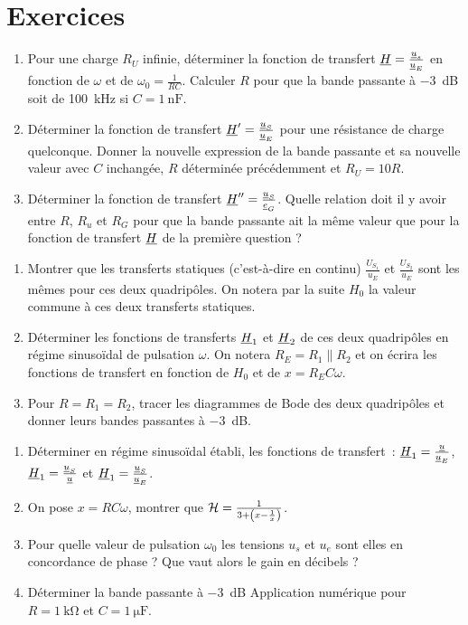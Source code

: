 \section{Exercices}
\begin{exercice}
	\begin{enumerate}
		\item Pour une charge $R_U$ infinie, déterminer la fonction de transfert $\underline{H} = \frac{\underline{u}_s}{\underline{u}_E}$ en fonction de $\omega$ et de $\omega_0 = \frac{1}{RC}$. Calculer $R$ pour que la bande passante à \SI{-3}{\dB} soit de \SI{100}{\kilo\hertz} si $C=\SI{1}{\nano\farad}$.
		\item Déterminer la fonction de transfert $\underline{H}' = \frac{\underline{u}_S}{\underline{u}_E}$ pour une résistance de charge quelconque. Donner la nouvelle expression de la bande passante et sa nouvelle valeur avec $C$ inchangée, $R$ déterminée précédemment et $R_U = 10 R$.
		\item Déterminer la fonction de transfert $\underline{H}'' = \frac{\underline{u}_S}{\underline{e}_G}$. Quelle relation doit il y avoir entre $R$, $R_u$ et $R_G$ pour que la bande passante ait la même valeur que pour la fonction de transfert $\underline{H}$ de la première question ?
	\end{enumerate}
\end{exercice}
\begin{exercice}
	\begin{enumerate}
		\item Montrer que les transferts statiques (c'est-à-dire en continu) $\frac{U_{S_1}}{u_E}$ et $\frac{U_{S_2}}{u_E}$ sont les mêmes pour ces deux quadripôles. On notera par la suite $H_0$ la valeur commune à ces deux transferts statiques.
		\item Déterminer les fonctions de transferts $\underline{H}_1$ et $\underline{H}_2$ de ces deux quadripôles en régime sinusoïdal de pulsation $\omega$. On notera $R_E = R_1 \parallel R_2$ et on écrira les fonctions de transfert en fonction de $H_0$ et de $x = R_E C \omega$.
		\item Pour $R = R_1 = R_2$, tracer les diagrammes de Bode des deux quadripôles et donner leurs bandes passantes à \SI{-3}{\dB}.
	\end{enumerate}
\end{exercice}
\begin{exercice}
	\begin{enumerate}
		\item Déterminer en régime sinusoïdal établi, les fonctions de transfert~: $\underline{H}_1 = \frac{\underline{u}}{\underline{u}_E}$, $\underline{H}_1 = \frac{\underline{u}_S}{\underline{u}}$ et $\underline{H}_1 = \frac{\underline{u}_S}{\underline{u}_E}$.
		\item On pose $x = R C \omega$, montrer que $\mathcal{H} = \frac{1}{3+\left(x-\frac{1}{x} \right)}$.
		\item Pour quelle valeur de pulsation $\omega_0$ les tensions $u_s$ et $u_e$ sont elles en concordance de phase ? Que vaut alors le gain en décibels ?
		\item Déterminer la bande passante à \SI{-3}{\dB} Application numérique pour $R = \SI{1}{\kilo\ohm}$ et $C = \SI{1}{\micro\farad}$. 
	\end{enumerate}
\end{exercice}